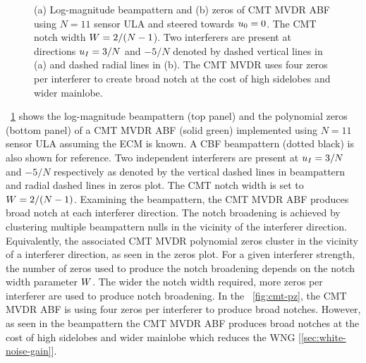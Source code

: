 \begin{figure}[!ht]
  \centering
{}


\caption[(a) Log-magnitude beampattern and (b) zeros of CMT MVDR ABF
  using $N = 11$ sensor ULA and steered towards $\ulook = 0$.]{(a) Log-magnitude beampattern and (b) zeros of CMT MVDR ABF
  using $N = 11$ sensor ULA and steered towards $\ulook = 0$. The CMT
  notch width $W = 2/(N-1$). Two interferers are present at
  directions $u_I = 3/N$ and $-5/N$ denoted by dashed vertical
  lines in (a) and dashed radial lines in (b). The CMT MVDR uses four
  zeros per interferer to create broad notch at the cost of high
  sidelobes and wider mainlobe.}
\label{fig:cmt-bp-pz}
\end{figure}

\figurename{}~\ref{fig:cmt-bp-pz} shows the log-magnitude beampattern
(top panel) and the polynomial zeros (bottom panel) of a CMT MVDR ABF
(solid green) implemented using $N = 11$ sensor ULA assuming the ECM
is known. A CBF beampattern (dotted black) is also shown for
reference. Two independent interferers are present at $u_I = 3/N$
and $-5/N$ respectively as denoted by the vertical dashed lines in
beampattern and radial dashed lines in zeros plot. The CMT notch width
is set to $W = 2/(N-1)$. Examining the beampattern, the CMT MVDR
ABF produces broad notch at each interferer direction. The notch
broadening is achieved by clustering multiple beampattern nulls in the
vicinity of the interferer direction. Equivalently, the associated CMT
MVDR polynomial zeros cluster in the vicinity of a interferer
direction, as seen in the zeros plot. For a given interferer strength,
the number of zeros used to produce the notch broadening depends on
the notch width parameter $W$. The wider the notch width required,
more zeros per interferer are used to produce notch broadening. In the
\figurename{}~\ref{fig:cmt-pz}, the CMT MVDR ABF is using four zeros
per interferer to produce broad notches. However, as seen in the
beampattern the CMT MVDR ABF produces broad notches at the cost of
high sidelobes and wider mainlobe which reduces the WNG
[\sect{}\ref{sec:white-noise-gain}].

